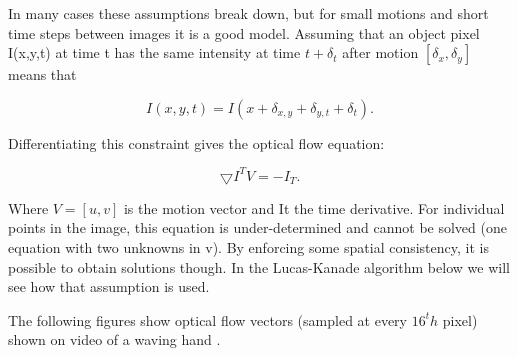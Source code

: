 In many cases these assumptions break down, but for small motions and short time steps between images it is a good model. Assuming that an object pixel I(x,y,t) at time t has the same intensity at time $t+\delta_t$ after motion $[\delta_x, \delta_y]$ means that 
\begin{dBox}
\begin{equation}
I(x,y,t) =I(x + \delta_{x,y} + \delta_{y,t} + \delta_t).
\end{equation}
\end{dBox}

Differentiating this constraint gives the optical flow equation:

\begin{dBox}
\begin{equation}
\bigtriangledown I^T V = - I_T.
\end{equation}
\end{dBox}

Where $V = [u, v]$ is the motion vector and It the time derivative. For individual points in the image, this equation is under-determined and cannot be solved (one equation with two unknowns in v). By enforcing some spatial consistency, it is possible to obtain solutions though. In the Lucas-Kanade algorithm below we will see how that assumption is used.\bigskip

The following figures show optical flow vectors (sampled at every $16^th$ pixel) shown on video of a waving hand \cite{dynamic3}. 

\begin{figure}[h]
\begin{dBox}
\centering
  \mbox{
   }
   \caption{\label{fig:dynamic678} }   
\end{dBox}   
\end{figure}

